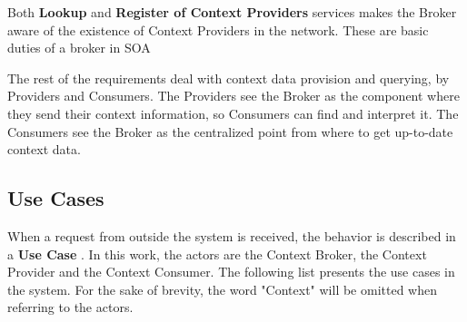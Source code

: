 Both \textbf{Lookup} and \textbf{Register of Context Providers} services makes the Broker aware of the existence of Context Providers in the network. These are basic duties of a broker in SOA 

The rest of the requirements deal with context data provision and querying, by Providers and Consumers. The Providers see the Broker as the component where they send their context information, so Consumers can find and interpret it. The Consumers see the Broker as the centralized point from where to get up-to-date context data.


\subsection{Use Cases}
When a request from outside the system is received, the behavior is described in a \textbf{Use Case} . In this work, the actors are the Context Broker, the Context Provider and the Context Consumer. The following list presents the use cases in the system. For the sake of brevity, the word "Context" will be omitted when referring to the actors.

